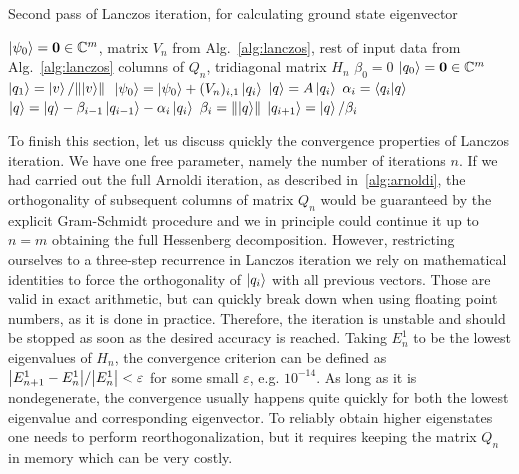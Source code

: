 \begin{algorithm}
	\algrenewcommand{}
	\algrenewcommand{}
	\caption{Second pass of Lanczos iteration, for calculating ground state eigenvector}
	\label{alg:lanczos_second_pass}
	\begin{algorithmic}[1]
	\Require \(\ket{\psi_0} = \vectorbold{0} \in \CC^m\), matrix \(V_n\) from Alg.~\ref{alg:lanczos}, rest of input data from Alg.~\ref{alg:lanczos}
		\Ensure columns of \(Q_n\), tridiagonal matrix \(H_n\)
		\State \(\beta_0 = 0\)
		\State \(\ket{q_0} = \vectorbold{0} \in \CC^m\)
		\State \(\ket{q_1} = \ket{v}/\norm*{\ket{v}}\)
			\State \(\ket{\psi_0} = \ket{\psi_0} + (V_n)_{i,1}\ket{q_i}\) 
			\State \(\ket{q} = A\ket{q_i}\)
			\State \(\alpha_i = \braket{q_i}{q}\)
			\State \(\ket{q} = \ket{q} - \beta_{i-1}\ket{q_{i-1}} - \alpha_i \ket{q_i}\)
			\State \(\beta_i = \norm{\ket{q}} \) 
			\State \(\ket{q_{i+1}} = \ket{q}/\beta_i \)
		\EndFor
	\end{algorithmic}
\end{algorithm}

To finish this section, let us discuss quickly the convergence properties of Lanczos iteration. We have one free parameter,
namely the number of iterations \(n\). If we had carried out the full Arnoldi iteration, as described in~\ref{alg:arnoldi},
the orthogonality of subsequent columns of matrix \(Q_n\) would be guaranteed by the explicit Gram-Schmidt procedure
and we in principle could continue it up to \(n = m\) obtaining the full Hessenberg decomposition. However, 
restricting ourselves to a three-step recurrence in Lanczos iteration we rely on mathematical identities to
force the orthogonality of \(\ket{q_i}\) with all previous vectors. Those are valid in exact arithmetic, but can
quickly break down when using floating point numbers, as it is done in practice. Therefore, the iteration is unstable and
should be stopped as soon as the desired accuracy is reached. Taking \(E_n^1\) to be the lowest eigenvalues of
\(H_n\), the convergence criterion can be defined as \(\abs{E_{n+1}^1 - E_{n}^1}/\abs{E_n^1} < \varepsilon\) for some
small \(\varepsilon\), e.g. \(10^{-14}\). As long as it is nondegenerate, the convergence usually happens quite quickly for
both the lowest eigenvalue and corresponding eigenvector. To reliably obtain higher eigenstates one needs to perform
reorthogonalization, but it requires keeping the matrix \(Q_n\) in memory which can be very costly.

